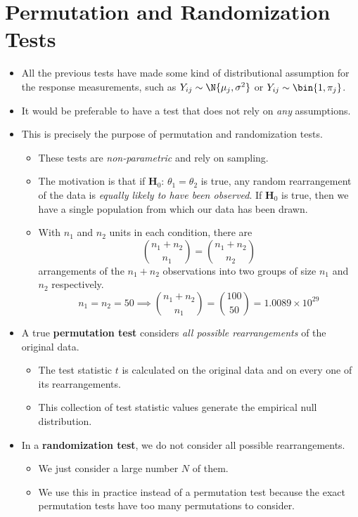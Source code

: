 \section{Permutation and Randomization Tests}
\begin{itemize}
      \item All the previous tests have made some kind of distributional assumption
            for the response measurements, such as $ Y_{ij} \sim \N{\mu_j,\sigma^2} $ or
            $ Y_{ij}\sim \bin{1,\pi_j} $.
      \item It would be preferable to have a test that does not rely on \emph{any}
            assumptions.
      \item This is precisely the purpose of permutation and randomization tests.
            \begin{itemize}
                  \item These tests are \emph{non-parametric} and rely on sampling.
                  \item The motivation is that if $ \mathbf{H}_0 $: $ \theta_1=\theta_2 $
                        is true, any random rearrangement of the data is \emph{equally likely
                              to have been observed}. If $ \mathbf{H}_0 $ is true, then we have a single population
                        from which our data has been drawn.
                  \item With $ n_1 $ and $ n_2 $ units in each condition, there are
                        \[ \binom{n_1+n_2}{n_1}=\binom{n_1+n_2}{n_2} \]
                        arrangements of the $ n_1+n_2 $ observations into two groups of size $ n_1 $
                        and $ n_2 $ respectively.
                        \[ n_1=n_2=50\implies\binom{n_1+n_2}{n_1}=\binom{100}{50}=1.0089\times 10^{29} \]
            \end{itemize}
      \item A true \textbf{permutation test} considers \emph{all possible rearrangements}
            of the original data.
            \begin{itemize}
                  \item The test statistic $ t $ is calculated on the original data and on every one of
                        its rearrangements.
                  \item This collection of test statistic values generate the empirical null distribution.
            \end{itemize}
      \item In a \textbf{randomization test}, we do not
            consider all possible rearrangements.
            \begin{itemize}
                  \item We just consider a large number $ N $ of them.
                  \item We use this in practice instead of a permutation test because
                        the exact permutation tests have too many permutations to consider.
            \end{itemize}
\end{itemize}
